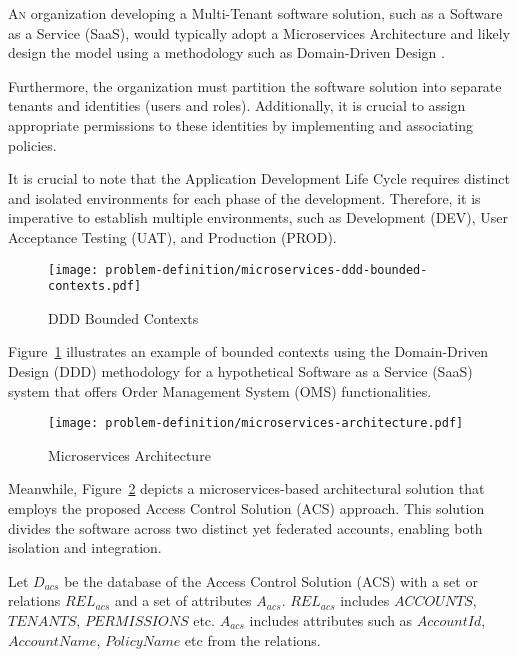 \lettrine{A}{n} organization developing a Multi-Tenant software solution, such as a Software as a Service (SaaS), would typically adopt a Microservices Architecture \cite{c2} and likely design the model using a methodology such as Domain-Driven Design \cite{c3}.

Furthermore, the organization must partition the software solution into separate tenants and identities (users and roles). Additionally, it is crucial to assign appropriate permissions to these identities by implementing and associating policies.

It is crucial to note that the Application Development Life Cycle requires distinct and isolated environments for each phase of the development. Therefore, it is imperative to establish multiple environments, such as Development (DEV), User Acceptance Testing (UAT), and Production (PROD).

\begin{figure}[htbp]
    \centering
    \texttt{[image: problem-definition/microservices-ddd-bounded-contexts.pdf]}
    \caption{DDD Bounded Contexts}
    \label{fig:microservices-ddd-bounded-contexts}
\end{figure}

Figure~\ref{fig:microservices-ddd-bounded-contexts} illustrates an example of bounded contexts using the Domain-Driven Design (DDD) methodology for a hypothetical Software as a Service (SaaS) system that offers Order Management System (OMS) functionalities.

\begin{figure}[htbp]
    \centering
    \texttt{[image: problem-definition/microservices-architecture.pdf]}
    \caption{Microservices Architecture}
    \label{fig:microservices-architecture}
\end{figure}

Meanwhile, Figure~\ref{fig:microservices-architecture} depicts a microservices-based architectural solution that employs the proposed Access Control Solution (ACS) approach. This solution divides the software across two distinct yet federated accounts, enabling both isolation and integration.

\vspace{15pt}

Let $D_{acs}$ be the database of the Access Control Solution (ACS) with a set or relations $REL_{acs}$ and a set of attributes $A_{acs}$.
$REL_{acs}$ includes $ACCOUNTS$, $TENANTS$, $PERMISSIONS$ etc.
$A_{acs}$ includes attributes such as $AccountId$, $AccountName$, $PolicyName$ etc from the relations.

